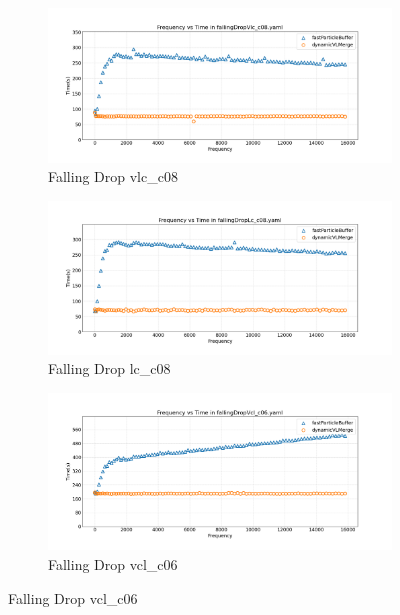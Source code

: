 
\begin{figure}[htbp]
    \centering
    \vspace{-0.5em}
    \begin{subfigure}[b]{\textwidth}
        \centering
        \includegraphics[width=0.9\linewidth]{graphs/fallingDrop/normalExperiments/freq/vlcc08.png}
        \vspace{-0.5em}
        \caption{\scriptsize Falling Drop vlc\_c08}
        \label{fig:vlcc08fallingDrop}
    \end{subfigure}

    \begin{subfigure}[b]{\textwidth}
        \centering
        \includegraphics[width=0.9\linewidth]{graphs/fallingDrop/normalExperiments/freq/lcc08.png}
        \vspace{-0.5em}
        \caption{\scriptsize Falling Drop lc\_c08}
        \label{fig:lcc08explodingLiquid}
    \end{subfigure}

    \begin{subfigure}[b]{\textwidth}
        \centering
        \includegraphics[width=0.9\linewidth]{graphs/fallingDrop/normalExperiments/freq/vclc06.png}
        \vspace{-0.5em}
        \caption{\scriptsize Falling Drop vcl\_c06}
        \label{fig:vclc06constantVelocityCube}
    \end{subfigure}


\end{figure}
